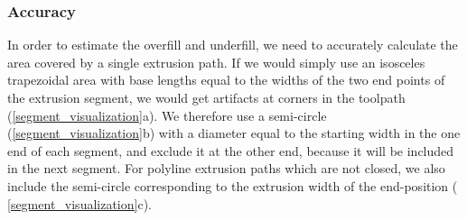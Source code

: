 \subsubsection{Accuracy}
In order to estimate the overfill and underfill, we need to accurately calculate the area covered by a single extrusion path.
If we would simply use an isosceles trapezoidal area with base lengths equal to the widths of the two end points of the extrusion segment, we would get artifacts at corners in the toolpath (\cref{segment_visualization}a).
We therefore use a semi-circle (\cref{segment_visualization}b) with a diameter equal to the starting width in the one end of each segment, and exclude it at the other end, because it will be included in the next segment.
For polyline extrusion paths which are not closed, we also include the semi-circle corresponding to the extrusion width of the end-position ( \cref{segment_visualization}c).


